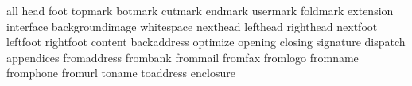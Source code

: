

\unprotect


\startinterface all
              {head}
              {foot}
           {topmark}
           {botmark}
           {cutmark}
           {endmark}
          {usermark}
          {foldmark}
         {extension}
         {interface}
   {backgroundimage}
        {whitespace}
          {nexthead}
          {lefthead}
         {righthead}
          {nextfoot}
          {leftfoot}
         {rightfoot}
           {content}
       {backaddress}
          {optimize}
           {opening}
           {closing}
         {signature}
          {dispatch}
        {appendices}
       {fromaddress}
          {frombank}
          {frommail}
           {fromfax}
          {fromlogo}
          {fromname}
         {fromphone}
           {fromurl}
            {toname}
         {toaddress}
         {enclosure}

